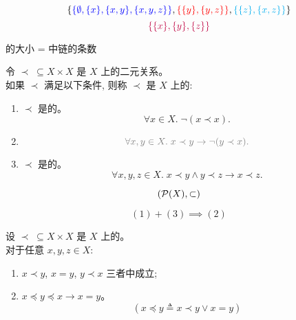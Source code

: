 \begin{frame}{}
  \[
    \{\textcolor{blue}{\{\emptyset, \{x\}, \{x, y\}, \{x, y, z\}\}},
      \textcolor{red}{\{\{y\}, \{y, z\}\}}, \textcolor{cyan}{\{\{z\}, \{x, z\}\}}\}
  \]
  \[
    \textcolor{purple}{\{\{x\}, \{y\}, \{z\}\}}
  \]

  \begin{theorem}
    的大小 = 中链的条数
  \end{theorem}
\end{frame}

\begin{frame}{}
  \begin{definition}
    令 $\prec\; \subseteq X \times X$ 是 $X$ 上的二元关系。\\[3pt]
    如果 $\prec$ 满足以下条件, 则称 $\prec$ 是 $X$ 上的: \\[6pt]

    \begin{enumerate}[(1)]
      \setlength{\itemsep}{6pt}
      \item $\prec$ 是的。
        \[
          \forall x \in X.\; \lnot(x \prec x).
        \]
      \item {}
        \[
          \gray{\forall x, y \in X.\; x \prec y \to \lnot (y \prec x).}
        \]
      \item $\prec$ 是的。
        \[
          \forall x, y, z \in X.\; x \prec y \land y \prec z \to x \prec z.
        \]
    \end{enumerate}
  \end{definition}
  \vspace{-0.20cm}
  \[
    (\mathcal{P}(X), \subset)
  \]

  \pause
  \vspace{-0.30cm}
  \[
    (1) + (3) \implies (2)
  \]
\end{frame}

\begin{frame}{}
  \begin{theorem}
    设 $\prec\; \subseteq X \times X$ 是 $X$ 上的。\\[5pt]
    对于任意 $x, y, z \in X$: \\[6pt]
    \begin{enumerate}[(1)]
      \setlength{\itemsep}{6pt}
      \item $x \prec y$, $x = y$, $y \prec x$ 三者中成立;
      \item $x \preceq y \preceq x \to x = y$。
        \[
          (x \preceq y \triangleq x \prec y \lor x = y)
        \]
    \end{enumerate}
  \end{theorem}
\end{frame}
